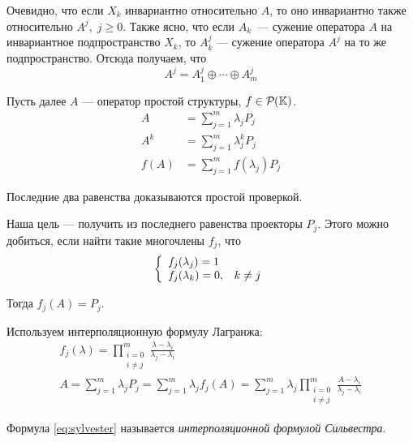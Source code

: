 Очевидно, что если $X_k$ инвариантно относительно $A$, то оно инвариантно также
относительно $A^j, \; j \geq 0$. Также ясно, что если $A_k$~— сужение оператора
$A$ на инвариантное подпространство $X_k$, то $A_k^j$ — сужение оператора $A^j$
на то же подпространство. Отсюда получаем, что
\[ A^j = A_1^j \oplus \dotsb \oplus A_m^j \]

Пусть далее $A$ — оператор простой структуры, $f\in \mathcal{P}_{}({\mathbb{K}})$.
\begin{align*}
    A &= \sum_{j=1}^m \lambda_j P_j \\
    A^k &= \sum_{j=1}^m \lambda_j^k P_j \\
    f(A) &= \sum_{j=1}^m f(\lambda_j) P_j
\end{align*}

Последние два равенства доказываются простой проверкой.

Наша цель — получить из последнего равенства проекторы $P_j$. Этого можно
добиться, если найти такие многочлены $f_j$, что
\[
\left\{\begin{array}{l l}
    f_j(\lambda_j) = 1 \\
    f_j(\lambda_k) = 0, & k \neq j
\end{array}\right.
\]

Тогда $f_j(A) = P_j$.

Используем интерполяционную формулу Лагранжа:
\begin{gather}
    f_j(\lambda) = \prod_{\substack{i = 0 \\ i \neq j}}^m \frac{\lambda -
        \lambda_i}{\lambda_j - \lambda_i} \nonumber \\ 
    A = \sum_{j=1}^m \lambda_j P_j = \sum_{j=1}^m \lambda_j f_j(A) =
    \sum_{j=1}^m \lambda_j \prod_{\substack{i = 0 \\ i \neq j}}^m \frac{A -
    \lambda_i}{\lambda_j - \lambda_i} \label{eq:sylvester}
\end{gather}

Формула \eqref{eq:sylvester} называется \emph{интерполяционной формулой
Сильвестра}.
